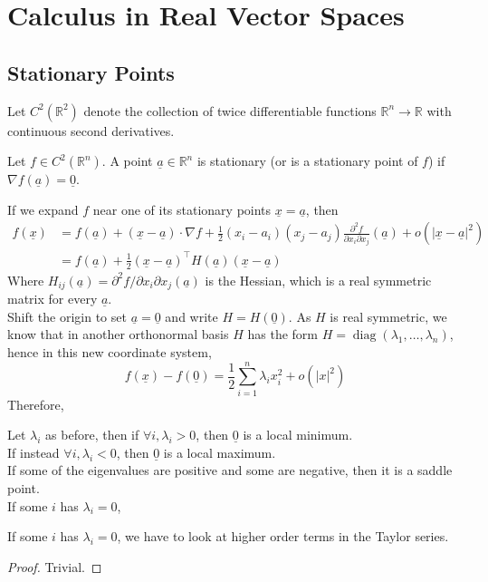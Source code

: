 \section{Calculus in Real Vector Spaces}
\subsection{Stationary Points}
Let $C^2(\mathbb R^2)$ denote the collection of twice differentiable functions $\mathbb R^n\to\mathbb R$ with continuous second derivatives.
\begin{definition}
    Let $f\in C^2(\mathbb R^n)$.
    A point $\underline{a}\in\mathbb R^n$ is stationary (or is a stationary point of $f$) if $\nabla f(\underline{a})=\underline{0}$.
\end{definition}
If we expand $f$ near one of its stationary points $\underline{x}=\underline{a}$, then
\begin{align*}
    f(\underline{x})&=f(\underline{a})+(\underline{x}-\underline{a})\cdot\nabla f+\frac{1}{2}(x_i-a_i)(x_j-a_j)\frac{\partial^2f}{\partial x_i\partial x_j}(\underline{a})+o(|\underline{x}-\underline{a}|^2)\\
    &=f(\underline{a})+\frac{1}{2}(\underline{x}-\underline{a})^\top H(\underline{a})(\underline{x}-\underline{a})
\end{align*}
Where $H_{ij}(\underline{a})=\partial^2f/\partial x_i\partial x_j(\underline{a})$ is the Hessian, which is a real symmetric matrix for every $\underline{a}$.\\
Shift the origin to set $\underline{a}=\underline{0}$ and write $H=H(\underline{0})$.
As $H$ is real symmetric, we know that in another orthonormal basis $H$ has the form $H=\operatorname{diag}(\lambda_1,\ldots,\lambda_n)$, hence in this new coordinate system,
$$f(\underline{x})-f(\underline{0})=\frac{1}{2}\sum_{i=1}^n\lambda_ix_i^2+o(|x|^2)$$
Therefore,
\begin{theorem}
    Let $\lambda_i$ as before, then if $\forall i,\lambda_i>0$, then $\underline{0}$ is a local minimum.\\
    If instead $\forall i,\lambda_i<0$, then $\underline{0}$ is a local maximum.\\
    If some of the eigenvalues are positive and some are negative, then it is a saddle point.\\
    If some $i$ has $\lambda_i=0$, 
\end{theorem}
If some $i$ has $\lambda_i=0$, we have to look at higher order terms in the Taylor series.
\begin{proof}
    Trivial.
\end{proof}
